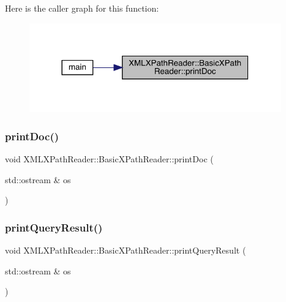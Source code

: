 Here is the caller graph for this function\+:
\nopagebreak
\begin{figure}[H]
\begin{center}
\leavevmode
\includegraphics[width=308pt]{d6/dbf/classXMLXPathReader_1_1BasicXPathReader_ab4607adfbae13b0ce3c7e5b944342207_icgraph}
\end{center}
\end{figure}
\mbox{\label{classXMLXPathReader_1_1BasicXPathReader_ab4607adfbae13b0ce3c7e5b944342207}} 
\subsubsection{\texorpdfstring{printDoc()}{printDoc()}\hspace{0.1cm}{\footnotesize\ttfamily [2/2]}}
{\footnotesize\ttfamily void X\+M\+L\+X\+Path\+Reader\+::\+Basic\+X\+Path\+Reader\+::print\+Doc (\begin{DoxyParamCaption}\item[{std\+::ostream \&}]{os }\end{DoxyParamCaption})}

\mbox{\label{classXMLXPathReader_1_1BasicXPathReader_a719ba9bbd4ae77d6be9a6544a2d0ccaf}} 
\subsubsection{\texorpdfstring{printQueryResult()}{printQueryResult()}\hspace{0.1cm}{\footnotesize\ttfamily [1/2]}}
{\footnotesize\ttfamily void X\+M\+L\+X\+Path\+Reader\+::\+Basic\+X\+Path\+Reader\+::print\+Query\+Result (\begin{DoxyParamCaption}\item[{std\+::ostream \&}]{os }\end{DoxyParamCaption})}

